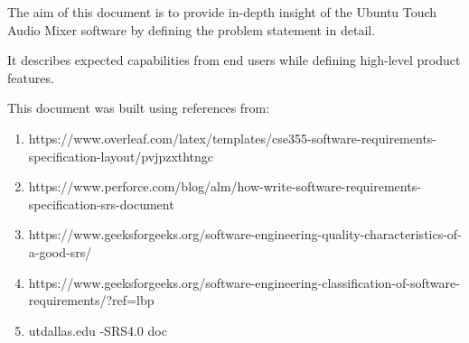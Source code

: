 
\label{ch:intro}
The aim of this document is to provide in-depth insight of the Ubuntu Touch Audio Mixer software by defining the problem statement in detail. 

It describes expected capabilities from end users while defining high-level product features.


This document was built using references from:


\begin{enumerate}
\item https://www.overleaf.com/latex/templates/cse355-software-requirements-specification-layout/pvjpzxthtngc
\item https://www.perforce.com/blog/alm/how-write-software-requirements-specification-srs-document
\item https://www.geeksforgeeks.org/software-engineering-quality-characteristics-of-a-good-srs/
\item https://www.geeksforgeeks.org/software-engineering-classification-of-software-requirements/?ref=lbp
\item utdallas.edu -SRS4.0 doc
\end{enumerate}